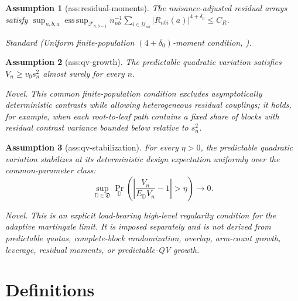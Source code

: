 \documentclass{article}
\newtheorem{assumption}{Assumption}
\begin{document}
\begin{assumption}[ass:residual-moments]\label{ass:residual-moments}
The nuisance-adjusted residual arrays satisfy \(\sup_{n,b,a}\operatorname*{ess\,sup}_{\mathcal F_{n,b-1}}n_{nb}^{-1}\sum_{i\in\mathcal U_{nb}}|R_{nbi}(a)|^{4+\delta_0}\le C_R\).
\par\smallskip\noindent\emph{Standard} (Uniform finite-population \((4+\delta_0)\)-moment condition, \cite{YuZhuLiu2025SharpStratified}).
\end{assumption}

\begin{assumption}[ass:qv-growth]\label{ass:qv-growth}
The predictable quadratic variation satisfies \(V_n\ge v_0s_n^2\) almost surely for every \(n\).
\par\smallskip\noindent\emph{Novel.} This common finite-population condition excludes asymptotically deterministic contrasts while allowing heterogeneous residual couplings; it holds, for example, when each root-to-leaf path contains a fixed share of blocks with residual contrast variance bounded below relative to \(s_n^2\).
\end{assumption}

\begin{assumption}[ass:qv-stabilization]\label{ass:qv-stabilization}
For every \(\eta>0\), the predictable quadratic variation stabilizes at its deterministic design expectation uniformly over the common-parameter class: \[\sup_{\mathbb D\in\mathfrak D}\Pr_{\mathbb D}\left(\left|\frac{V_n}{E_{\mathbb D}V_n}-1\right|>\eta\right)\longrightarrow0.\]
\par\smallskip\noindent\emph{Novel.} This is an explicit load-bearing high-level regularity condition for the adaptive martingale limit. It is imposed separately and is not derived from predictable quotas, complete-block randomization, overlap, arm-count growth, leverage, residual moments, or predictable-QV growth.
\end{assumption}

\section{Definitions}
\end{document}
